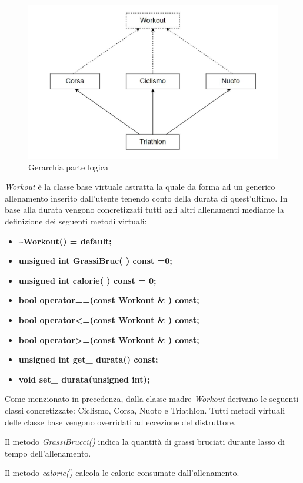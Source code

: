\documentclass[12pt, a4paper]{article}
\begin{document}
\begin{figure}[H]
	\centering
	
	\includegraphics[scale=0.45]{img/graph.jpg}
	\caption{Gerarchia parte logica}
\end{figure}


\emph{Workout} è la classe base virtuale astratta la quale  da forma ad un generico allenamento inserito dall'utente tenendo conto della durata di quest'ultimo. In base alla durata vengono concretizzati tutti agli altri allenamenti mediante la definizione dei seguenti metodi virtuali:
\vspace{1cm}
\begin{itemize}
\item \textbf{\textasciitilde Workout() = default;}
\item \textbf{unsigned int GrassiBruc( ) const =0;}
\item \textbf{unsigned int calorie( ) const = 0;}
\item \textbf{bool operator==(const Workout \& ) const;}
\item \textbf{bool operator\textless =(const Workout \& ) const;}
\item \textbf{bool operator\textgreater =(const Workout \& ) const;}
\item \textbf{unsigned int get\_ durata() const;}
\item \textbf{void set\_ durata(unsigned int);}

\end{itemize}

Come menzionato in precedenza, dalla classe madre \emph{Workout} derivano le seguenti classi concretizzate: Ciclismo, Corsa, Nuoto e Triathlon. Tutti metodi virtuali delle classe base vengono overridati ad eccezione del distruttore.\par
Il metodo \emph{GrassiBrucci()} indica la quantità di grassi bruciati durante lasso di tempo dell'allenamento.\par
Il metodo \emph{calorie()} calcola le calorie consumate dall'allenamento.
\end{document}
